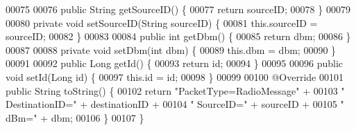 \begin{DoxyCode}
00075 
00076     \textcolor{keyword}{public} String getSourceID() \{
00077         \textcolor{keywordflow}{return} sourceID;
00078     \}
00079 
00080     \textcolor{keyword}{private} \textcolor{keywordtype}{void} setSourceID(String sourceID) \{
00081         this.sourceID = sourceID;
00082     \}
00083 
00084     \textcolor{keyword}{public} \textcolor{keywordtype}{int} getDbm() \{
00085         \textcolor{keywordflow}{return} dbm;
00086     \}
00087 
00088     \textcolor{keyword}{private} \textcolor{keywordtype}{void} setDbm(\textcolor{keywordtype}{int} dbm) \{
00089         this.dbm = dbm;
00090     \}
00091 
00092     \textcolor{keyword}{public} Long getId() \{
00093         \textcolor{keywordflow}{return} id;
00094     \}
00095 
00096     \textcolor{keyword}{public} \textcolor{keywordtype}{void} setId(Long \textcolor{keywordtype}{id}) \{
00097         this.\textcolor{keywordtype}{id} = id;
00098     \}
00099 
00100     @Override
00101     \textcolor{keyword}{public} String toString() \{
00102         \textcolor{keywordflow}{return} \textcolor{stringliteral}{"PacketType=RadioMessage"} +
00103                 \textcolor{stringliteral}{" DestinationID="} + destinationID +
00104                 \textcolor{stringliteral}{" SourceID="} + sourceID +
00105                 \textcolor{stringliteral}{" dBm="} + dbm;
00106     \}
00107 \}
\end{DoxyCode}
